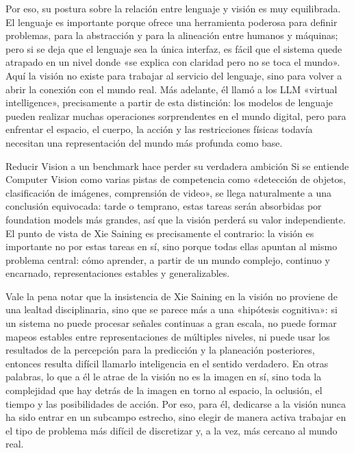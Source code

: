 \documentclass[a4paper,12pt]{article}
\begin{document}
Por eso, su postura sobre la relación entre lenguaje y visión es muy equilibrada. El lenguaje es importante porque ofrece una herramienta poderosa para definir problemas, para la abstracción y para la alineación entre humanos y máquinas; pero si se deja que el lenguaje sea la única interfaz, es fácil que el sistema quede atrapado en un nivel donde «se explica con claridad pero no se toca el mundo». Aquí la visión no existe para trabajar al servicio del lenguaje, sino para volver a abrir la conexión con el mundo real. Más adelante, él llamó a los LLM «virtual intelligence», precisamente a partir de esta distinción: los modelos de lenguaje pueden realizar muchas operaciones sorprendentes en el mundo digital, pero para enfrentar el espacio, el cuerpo, la acción y las restricciones físicas todavía necesitan una representación del mundo más profunda como base.

\begin{warningbox}{Reducir Vision a un benchmark hace perder su verdadera ambición}
Si se entiende Computer Vision como varias pistas de competencia como «detección de objetos, clasificación de imágenes, comprensión de video», se llega naturalmente a una conclusión equivocada: tarde o temprano, estas tareas serán absorbidas por foundation models más grandes, así que la visión perderá su valor independiente. El punto de vista de Xie Saining es precisamente el contrario: la visión es importante no por estas tareas en sí, sino porque todas ellas apuntan al mismo problema central: cómo aprender, a partir de un mundo complejo, continuo y encarnado, representaciones estables y generalizables.
\end{warningbox}

Vale la pena notar que la insistencia de Xie Saining en la visión no proviene de una lealtad disciplinaria, sino que se parece más a una «hipótesis cognitiva»: si un sistema no puede procesar señales continuas a gran escala, no puede formar mapeos estables entre representaciones de múltiples niveles, ni puede usar los resultados de la percepción para la predicción y la planeación posteriores, entonces resulta difícil llamarlo inteligencia en el sentido verdadero. En otras palabras, lo que a él le atrae de la visión no es la imagen en sí, sino toda la complejidad que hay detrás de la imagen en torno al espacio, la oclusión, el tiempo y las posibilidades de acción. Por eso, para él, dedicarse a la visión nunca ha sido entrar en un subcampo estrecho, sino elegir de manera activa trabajar en el tipo de problema más difícil de discretizar y, a la vez, más cercano al mundo real.
\end{document}
